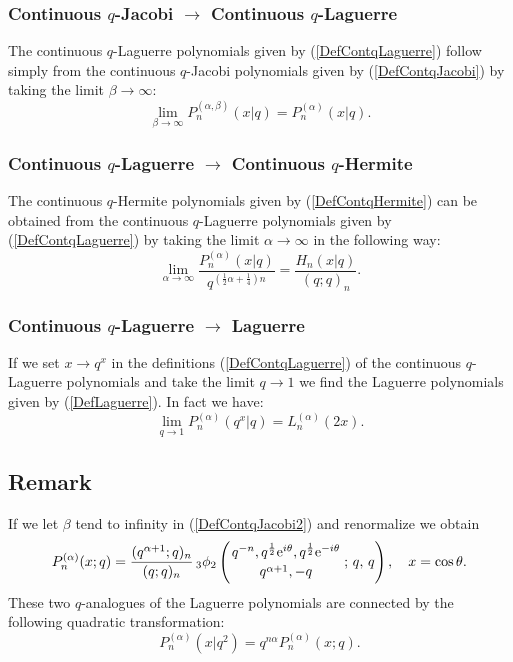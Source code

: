 \documentclass[envcountchap,graybox]{svmono}
\newcounter{rom}
\newcommand{\qhyp}[5]{\mbox{}_{#1}{\phi}_{#2}
\left(\genfrac{}{}{0pt}{}{#3}{#4}\,;\,q,\,#5\right)}
\newcommand{\e}{\textrm{e}}
\begin{document}
\subsubsection*{Continuous $q$-Jacobi $\rightarrow$ Continuous $q$-Laguerre}
The continuous $q$-Laguerre polynomials given by (\ref{DefContqLaguerre})
follow simply from the continuous $q$-Jacobi polynomials given by (\ref{DefContqJacobi})
by taking the limit $\beta\rightarrow\infty$:
$$\lim _{\beta\rightarrow\infty} P_n^{(\alpha,\beta)}(x|q)=P_n^{(\alpha)}(x|q).$$

\subsubsection*{Continuous $q$-Laguerre $\rightarrow$ Continuous $q$-Hermite}
The continuous $q$-Hermite polynomials given by (\ref{DefContqHermite}) can
be obtained from the continuous $q$-Laguerre polynomials given by
(\ref{DefContqLaguerre}) by taking the limit $\alpha\rightarrow\infty$ in the
following way:
\begin{equation}
\lim_{\alpha\rightarrow\infty}
\frac{P_n^{(\alpha)}(x|q)}{q^{(\frac{1}{2}\alpha+\frac{1}{4})n}}
=\frac{H_n(x|q)}{(q;q)_n}.
\end{equation}

\subsubsection*{Continuous $q$-Laguerre $\rightarrow$ Laguerre}
If we set $x\rightarrow q^x$ in the definitions (\ref{DefContqLaguerre}) of the continuous
$q$-Laguerre polynomials and take the limit $q\rightarrow 1$ we find the Laguerre polynomials
given by (\ref{DefLaguerre}). In fact we have:
\begin{equation}
\lim_{q\rightarrow 1}P_n^{(\alpha)}(q^x|q)=L_n^{(\alpha)}(2x).
\end{equation}

\subsection*{Remark} If we let $\beta$ tend to infinity in (\ref{DefContqJacobi2})
and renormalize we obtain
\begin{equation}
\label{DefContqLaguerre2}
P_n^{(\alpha)}(x;q)=\frac{(q^{\alpha+1};q)_n}{(q;q)_n}\,\qhyp{3}{2}
{q^{-n},q^{\frac{1}{2}}\e^{i\theta},q^{\frac{1}{2}}\e^{-i\theta}}
{q^{\alpha+1},-q}{q},\quad x=\cos\theta.
\end{equation}
These two $q$-analogues of the Laguerre polynomials are connected by the
following quadratic transformation:
$$P_n^{(\alpha)}(x|q^2)=q^{n\alpha}P_n^{(\alpha)}(x;q).$$
\end{document}
